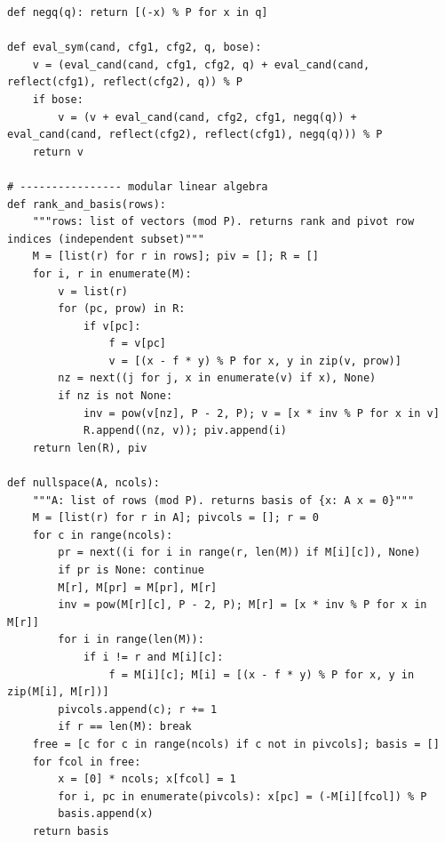 \documentclass[10pt]{article}
\begin{document}
\begin{lstlisting}
def negq(q): return [(-x) % P for x in q]

def eval_sym(cand, cfg1, cfg2, q, bose):
    v = (eval_cand(cand, cfg1, cfg2, q) + eval_cand(cand, reflect(cfg1), reflect(cfg2), q)) % P
    if bose:
        v = (v + eval_cand(cand, cfg2, cfg1, negq(q)) + eval_cand(cand, reflect(cfg2), reflect(cfg1), negq(q))) % P
    return v

# ---------------- modular linear algebra
def rank_and_basis(rows):
    """rows: list of vectors (mod P). returns rank and pivot row indices (independent subset)"""
    M = [list(r) for r in rows]; piv = []; R = []
    for i, r in enumerate(M):
        v = list(r)
        for (pc, prow) in R:
            if v[pc]:
                f = v[pc]
                v = [(x - f * y) % P for x, y in zip(v, prow)]
        nz = next((j for j, x in enumerate(v) if x), None)
        if nz is not None:
            inv = pow(v[nz], P - 2, P); v = [x * inv % P for x in v]
            R.append((nz, v)); piv.append(i)
    return len(R), piv

def nullspace(A, ncols):
    """A: list of rows (mod P). returns basis of {x: A x = 0}"""
    M = [list(r) for r in A]; pivcols = []; r = 0
    for c in range(ncols):
        pr = next((i for i in range(r, len(M)) if M[i][c]), None)
        if pr is None: continue
        M[r], M[pr] = M[pr], M[r]
        inv = pow(M[r][c], P - 2, P); M[r] = [x * inv % P for x in M[r]]
        for i in range(len(M)):
            if i != r and M[i][c]:
                f = M[i][c]; M[i] = [(x - f * y) % P for x, y in zip(M[i], M[r])]
        pivcols.append(c); r += 1
        if r == len(M): break
    free = [c for c in range(ncols) if c not in pivcols]; basis = []
    for fcol in free:
        x = [0] * ncols; x[fcol] = 1
        for i, pc in enumerate(pivcols): x[pc] = (-M[i][fcol]) % P
        basis.append(x)
    return basis
\end{lstlisting}
\end{document}
